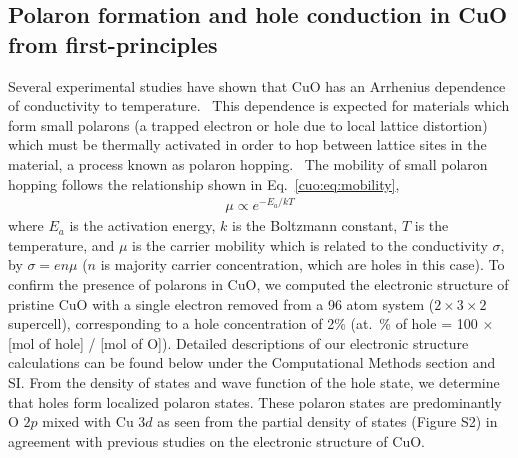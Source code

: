 \subsection{Polaron formation and hole conduction in CuO from first-principles }
Several experimental studies have shown that CuO has an Arrhenius dependence of conductivity to temperature.~\cite{samokhvalov1993low,wu2014charge,zheng2001evidence,jeong1996nonstoichiometry,zheng2004fast}
This dependence is expected for materials which form small polarons (a trapped electron or hole due to local lattice distortion) which must be thermally activated in order to hop between lattice sites in the material, a process known as polaron hopping.~\cite{mott1968conduction}
The mobility of small polaron hopping follows the relationship shown in Eq.~\ref{cuo:eq:mobility},
\begin{align}
    \mu \propto e^{-E_a / kT}
    \label{cuo:eq:mobility}
\end{align}
where $E_a$ is the activation energy, $k$ is the Boltzmann constant, $T$ is the temperature, and $\mu$ is the carrier mobility which is related to the conductivity $\sigma$, by $\sigma = en\mu$ ($n$ is majority carrier concentration, which are holes in this case). To confirm the presence of polarons in CuO, we computed the electronic structure of pristine CuO with a single electron removed from a 96 atom system ($2\times 3\times 2$ supercell), corresponding to a hole concentration of 2\% (at.\ \% of hole = 100 $\times$ [mol of hole] / [mol of O]). Detailed descriptions of our electronic structure calculations can be found below under the Computational Methods section and SI. From the density of states and wave function of the hole state, we determine that holes form localized polaron states. These polaron states are predominantly O $2p$ mixed with Cu $3d$ as seen from the partial density of states (Figure S2) in agreement with previous studies on the electronic structure of CuO.~\cite{ghijsen1988electronic}

